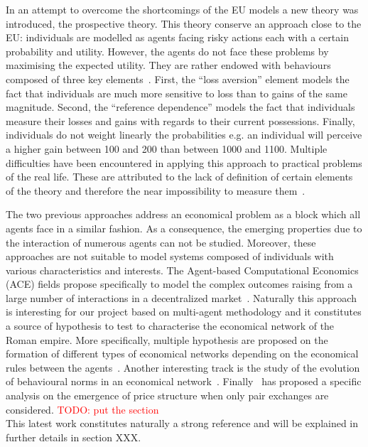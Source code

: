 \documentclass{wscpaperproc}
\newcommand{\memo}[2]{\textcolor{#1}{#2}}
\newcommand{\todo}[1]{\memo{red}{TODO: #1\\}}
\begin{document}
In an attempt to overcome the shortcomings of the EU models a new theory was introduced, the prospective theory. This theory conserve an approach close to the EU: individuals are modelled as agents facing risky actions each with a certain probability and utility. However, the agents do not face these problems by maximising the expected utility. They are rather endowed with behaviours composed of three key elements~\cite{camerer_prospect_2004}. First, the ``loss aversion'' element models the fact that individuals are much more sensitive to loss than to gains of the same magnitude. Second, the ``reference dependence'' models the fact that individuals measure their losses and gains with regards to their current possessions. Finally, individuals do not weight linearly the probabilities e.g. an individual will perceive a higher gain between 100 and 200 than between 1000 and 1100. Multiple difficulties have been encountered in applying this approach to practical problems of the real life. These are attributed to the lack of definition of certain elements of the theory and therefore the near impossibility to measure them~\cite{barberis_thirty_2012}.

The two previous approaches address an economical problem as a block which all agents face in a similar fashion. As a consequence, the emerging properties due to the interaction of numerous agents can not be studied. Moreover, these approaches are not suitable to model systems composed of individuals with various characteristics and interests. The Agent-based Computational Economics (ACE) fields propose specifically to model the complex outcomes raising from a large number of interactions in a decentralized market~\cite{tesfatsion_agent-based_2003}. Naturally this approach is interesting for our project based on multi-agent methodology and it constitutes a source of hypothesis to test to characterise the economical network of the Roman empire. More specifically, multiple hypothesis are proposed on the formation of different types of economical networks depending on the economical rules between the agents~\cite{kirman_evolving_2001,tesfatsion_structure_2001}. Another interesting track is the study of the evolution of behavioural norms in an economical network~\cite{epstein_learning_2001,axelrod_complexity_1997}. Finally~\cite{gintis_emergence_2006} has proposed a specific analysis on the emergence of price structure when only pair exchanges are considered. 
\todo{put the section}
This latest work constitutes naturally a strong reference and will be explained in further details in section XXX.
\end{document}
